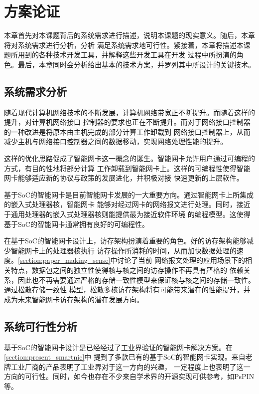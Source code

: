 
\section{方案论证}

本章首先对本课题背后的系统需求进行描述，说明本课题的现实意义。随后，本章将对系统需求进行分析，分析
满足系统需求地可行性。紧接着，本章将描述本课题所用到的各种技术开发工具，并解释这些开发工具在开发
过程中所扮演的角色。最后，本章同时会分析给出基本的技术方案，并罗列其中所设计的关键技术。

\subsection{系统需求分析}

随着现代计算机网络技术的不断发展，计算机网络带宽正不断提升。而随着这样的提升，对计算机网络接口
控制器的要求也正在不断提升。而对于网络接口控制器的一种改进是将原本由主机完成的部分计算工作卸载到
网络接口控制器上，从而减少主机与网络接口控制器之间的数据移动，实现网络处理性能的提升。

这样的优化思路促成了智能网卡这一概念的诞生。智能网卡允许用户通过可编程的方式，有目的性地将部分计算
工作卸载到智能网卡上。这样的可编程性使得智能网卡能够适应新的协议与政策的发展进化，并积极对接
快速更新的上层软件。

基于SoC的智能网卡是目前智能网卡发展的一大重要方向。通过智能网卡上所集成的嵌入式处理器核，智能网卡
能够对经过网卡的网络报文进行处理。同时，接近于通用处理器的嵌入式处理器核则能提供最为接近软件环境
的编程模型。这使得基于SoC的智能网卡通常拥有良好的可编程性。

在基于SoC的智能网卡设计上，访存架构扮演着重要的角色。好的访存架构能够减少智能网卡上的处理器核执行
访存操作所消耗的时间，从而加快数据处理的速度。\autoref{section:paper_making_sense}中讨论了当前
网络报文处理的应用场景下的相关特点，数据包之间的独立性使得核与核之间的访存操作不再具有严格的
依赖关系，因此也不再需要通过严格的存储一致性模型来保证核与核之间的存储一致性。通过松散存储一致性
模型，松散多核访存架构将有可能带来潜在的性能提升，并成为未来智能网卡访存架构的潜在发展方向。

\subsection{系统可行性分析}

基于SoC的智能网卡设计是已经经过了工业界验证的智能网卡解决方案。在\autoref{section:present_smartnic}中
提到了多款已有的基于SoC的智能网卡实现。来自老牌工业厂商的产品表明了工业界对于这一方向的兴趣，
一定程度上也表明了这一方向的可行性。同时，如今也存在不少来自学术界的开源实现可供参考，如PsPIN\cite{di2020pspin}等。

